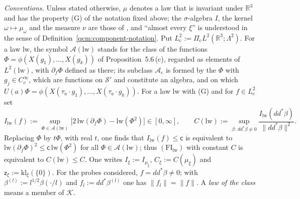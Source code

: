 \documentclass[11pt,letterpaper,reqno]{amsart}
\theoremstyle{definition}
\begin{document}
\emph{Conventions.}
Unless stated otherwise, $\mu$ denotes a law that is invariant under $\mathbb R^3$ and has the property (G) of the notation fixed above;
the $\sigma$-algebra $I$, the kernel $\omega\mapsto\mu_\omega$ and the measure $\nu$ are those of \cite[Theorem~A and Section~5]{ErgodicComponents}, and ``almost every $\xi$'' is understood in the sense of Definition~\ref{qcm:component-notation}.
Put $L^2_{\mathrm c}:=\Pi_{\mathrm c}L^2(\mathbb R^3;\Lambda^2)$.
For a law $\mathrm{lw}$, the symbol $\mathcal A(\mathrm{lw})$ stands for the class of the functions $\Phi=\phi(X(g_1),\dots,X(g_k))$ of Proposition~5.6\,(c), regarded as elements of $L^2(\mathrm{lw})$, with $\partial_f\Phi$ defined as there;
its subclass $\mathcal A_{\mathrm c}$ is formed by the $\Phi$ with $g_j\in C_c^\infty$, which are functions on $\mathcal S'$ and constitute an algebra, and on which $U(a)\Phi=\phi(X(\tau_a\cdot g_1),\dots,X(\tau_a\cdot g_k))$.
For a law $\mathrm{lw}$ with (G) and for $f\in L^2_{\mathrm c}$ set
\begin{equation*}
I_{\mathrm{lw}}(f):=\sup_{\Phi\in\mathcal A(\mathrm{lw})}\bigl[2\,\mathrm{lw}(\partial_f\Phi)-\mathrm{lw}(\Phi^2)\bigr]\in[0,\infty],\qquad C(\mathrm{lw}):=\sup_{\beta:\,dd^*\beta\ne0}\frac{I_{\mathrm{lw}}(dd^*\beta)}{\|dd^*\beta\|^2}.
\end{equation*}
Replacing $\Phi$ by $t\Phi$, with real $t$, one finds that $I_{\mathrm{lw}}(f)\le\mathsf c$ is equivalent to $\mathrm{lw}(\partial_f\Phi)^2\le\mathsf c\,\mathrm{lw}(\Phi^2)$ for all $\Phi\in\mathcal A(\mathrm{lw})$;
thus $(\mathrm{FI}_{\mathrm{lw}})$ with constant $C$ is equivalent to $C(\mathrm{lw})\le C$.
One writes $I_\xi:=I_{\mu_\xi}$, $C_\xi:=C(\mu_\xi)$ and $\mathsf z_\xi:=\mathrm{kl}_\xi(\{0\})$.
For the probes considered, $f=dd^*\beta\ne0$;
with $\beta^{(l)}:=l^{1/2}\beta(\cdot/l)$ and $f_l:=dd^*\beta^{(l)}$ one has $\|f_l\|=\|f\|$.
A \emph{law of the class} means a member of $\mathcal K$.
\end{document}
